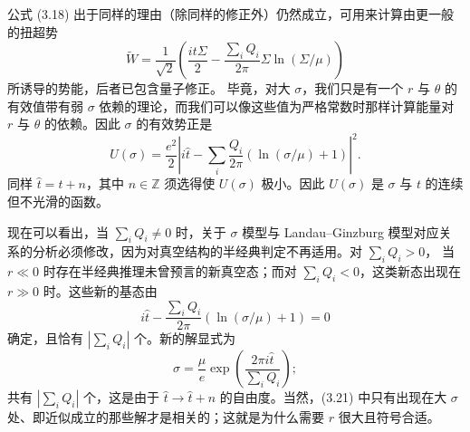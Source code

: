 
公式 (3.18) 出于同样的理由（除同样的修正外）仍然成立，可用来计算由更一般的扭超势
\begin{equation}\tag{3.19}
\widetilde W=\frac{1}{\sqrt2}\left(\frac{it\Sigma}{2}-\frac{\sum_iQ_i}{2\pi}\Sigma\ln(\Sigma/\mu)\right)
\end{equation}
所诱导的势能，后者已包含量子修正。
毕竟，对大 $\sigma$，我们只是有一个 $r$ 与 $\theta$ 的有效值带有弱 $\sigma$ 依赖的理论，而我们可以像这些值为严格常数时那样计算能量对 $r$ 与 $\theta$ 的依赖。因此 $\sigma$ 的有效势正是
\begin{equation}\tag{3.20}
U(\sigma)=\frac{e^2}{2}\left|i\hat t-\sum_i\frac{Q_i}{2\pi}\left(\ln(\sigma/\mu)+1\right)\right|^2.
\end{equation}
同样 $\hat t=t+n$，其中 $n\in\mathbb{Z}$ 须选得使 $U(\sigma)$ 极小。因此 $U(\sigma)$ 是 $\sigma$ 与 $t$ 的连续但不光滑的函数。

现在可以看出，当 $\sum_iQ_i\neq0$ 时，关于 $\sigma$ 模型与 Landau--Ginzburg 模型对应关系的分析必须修改，因为对真空结构的半经典判定不再适用。对 $\sum_iQ_i>0$，
\label{op:27}
当 $r\ll0$ 时存在半经典推理未曾预言的新真空态；而对 $\sum_iQ_i<0$，这类新态出现在 $r\gg0$ 时。这些新的基态由
\begin{equation}\tag{3.21}
i\hat t-\frac{\sum_iQ_i}{2\pi}\left(\ln(\sigma/\mu)+1\right)=0
\end{equation}
确定，且恰有 $|\sum_iQ_i|$ 个。新的解显式为
\begin{equation}\tag{3.22}
\sigma=\frac{\mu}{e}\exp\left(\frac{2\pi i\hat t}{\sum_iQ_i}\right);
\end{equation}
共有 $|\sum_iQ_i|$ 个，这是由于 $\hat t\to\hat t+n$ 的自由度。当然，(3.21) 中只有出现在大 $\sigma$ 处、即近似成立的那些解才是相关的；这就是为什么需要 $r$ 很大且符号合适。

